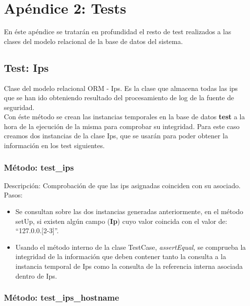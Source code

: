 \chapter{Apéndice 2: Tests}
\label{chap:tests}

En éste apéndice se tratarán en profundidad el resto de test realizados a las clases del modelo relacional de la base de datos del sistema.

\section[\quad Test: Ips]{Test: Ips}


Clase del modelo relacional ORM - Ips. Es la clase que almacena todas las ips que se han ido obteniendo resultado del procesamiento de log de la fuente de seguridad.\\

Con éste método se crean las instancias temporales en la base de datos \textbf{test} a la hora de la ejecución de la misma para comprobar su integridad. Para este caso creamos dos instancias de la clase Ips, que se usarán para poder obtener la información en los test siguientes.\\



\subsection{\quad Método: test\_ips}

Descripción: Comprobación de que las ips asignadas coinciden con su asociado.\\
Pasos:
\begin{itemize}
\item Se consultan sobre las dos instancias generadas anteriormente, en el método setUp, si existen algún campo (\textbf{Ip}) cuyo valor coincida con el valor de: ``127.0.0.[2-3]''.
\item Usando el método interno de la clase TestCase, \emph{assertEqual}, se comprueba la integridad de la información que deben contener tanto la consulta a la instancia temporal de Ips como la consulta de la referencia interna asociada dentro de Ips.
\end{itemize}


\subsection{\quad Método: test\_ips\_hostname}


